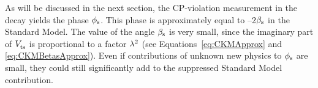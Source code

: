 As will be discussed in the next section, the CP-violation measurement in the \BstoJpsiphi{} decay yields the phase $\phi_\text{s}$. This phase is
approximately equal to --2$\beta_\text{s}$ in the Standard Model. The value of the angle $\beta_\text{s}$ is very small, since the imaginary part of $\Vts$ is
proportional to a factor $\lambda^2$ (see Equations~\ref{eq:CKMApprox} and \ref{eq:CKMBetasApprox}). Even if contributions of unknown new
physics to $\phi_\text{s}$ are small, they could still significantly add to the suppressed Standard Model contribution.
